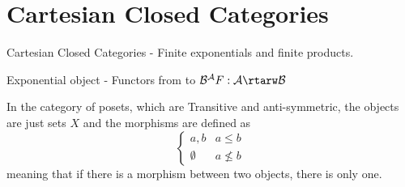 \section{Cartesian Closed Categories}

Cartesian Closed Categories - Finite exponentials and finite products.

Exponential object - Functors from  to 
$ \mathcal{B}^{\mathcal{A}} F : \mathcal{A} \rtarw \mathcal{B} $

In the category of posets, which are Transitive and anti-symmetric, the objects are just sets $X$ and the morphisms are defined as
\[ \begin{cases} 
      {a, b} & a \leq b \\
      \emptyset & a \nleq b
   \end{cases}
 \]
 meaning that if there is a morphism between two objects, there is only one.

